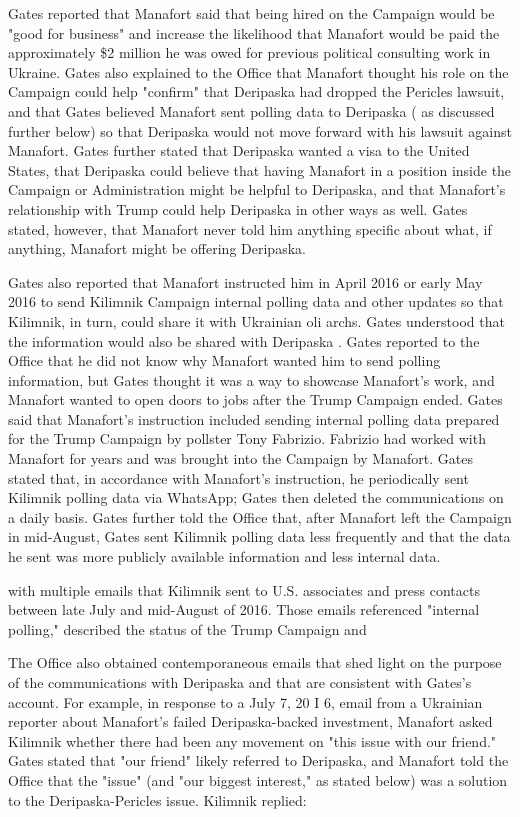 Gates reported that Manafort said that being hired on the Campaign would be "good for business" and increase the likelihood that Manafort would be paid the approximately \$2 million he was owed for previous political consulting work in Ukraine.%
Gates also explained to the Office that Manafort thought his role on the Campaign could help "confirm" that Deripaska had dropped the Pericles lawsuit, and that Gates believed Manafort sent polling data to Deripaska ( as discussed further below) so that Deripaska would not move forward with his lawsuit against Manafort.%
Gates further stated that Deripaska wanted a visa to the United States, that Deripaska could believe that having Manafort in a position inside the Campaign or Administration might be helpful to Deripaska, and that Manafort's relationship with Trump could help Deripaska in other ways as well. %
Gates stated, however, that Manafort never told him anything specific about what, if anything, Manafort might be offering Deripaska.%

Gates also reported that Manafort instructed him in April 2016 or early May 2016 to send Kilimnik Campaign internal polling data and other updates so that Kilimnik, in turn, could share it with Ukrainian oli archs.%
Gates understood that the information would also be shared with Deripaska . %
Gates reported to the Office that he did not know why Manafort wanted him to send polling information, but Gates thought it was a way to showcase Manafort's work, and Manafort wanted to open doors to jobs after the Trump Campaign ended.%
Gates said that Manafort's instruction included sending internal polling data prepared for the Trump Campaign by pollster Tony Fabrizio.%
Fabrizio had worked with Manafort for years and was brought into the Campaign by Manafort. Gates stated that, in accordance with Manafort's instruction, he periodically sent Kilimnik polling data via WhatsApp; Gates then deleted the communications on a daily basis. %
Gates further told the Office that, after Manafort left the Campaign in mid-August, Gates sent Kilimnik polling data less frequently and that the data he sent was more publicly available information and less internal data.%

with multiple emails that Kilimnik sent to U.S. associates and press contacts between late July and mid-August of 2016. Those emails referenced "internal polling," described the status of the Trump Campaign and

The Office also obtained contemporaneous emails that shed light on the purpose of the communications with Deripaska and that are consistent with Gates's account. For example, in response to a July 7, 20 I 6, email from a Ukrainian reporter about Manafort's failed Deripaska-backed investment, Manafort asked Kilimnik whether there had been any movement on "this issue with our friend."%
Gates stated that "our friend" likely referred to Deripaska,%
and Manafort told the Office that the "issue" (and "our biggest interest," as stated below) was a solution to the Deripaska-Pericles issue.%
Kilimnik replied:

